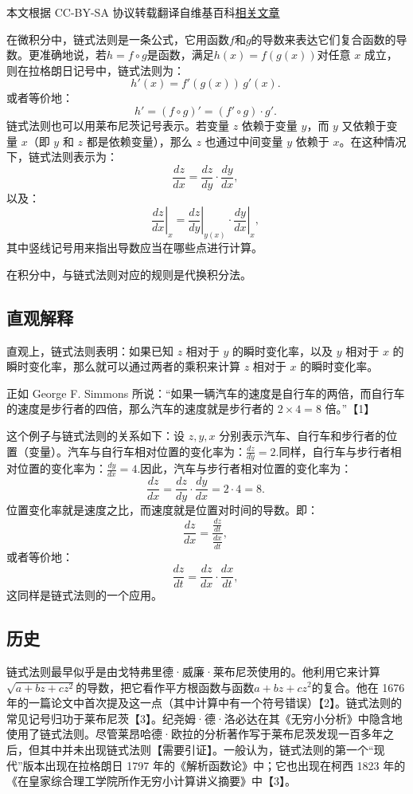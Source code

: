 
本文根据 CC-BY-SA 协议转载翻译自维基百科\href{https://en.wikipedia.org/wiki/Chain_rule}{相关文章}

在微积分中，链式法则是一条公式，它用函数$f$和$g$的导数来表达它们复合函数的导数。更准确地说，若$h = f \circ g$是函数，满足$h(x) = f(g(x))$对任意 $x$ 成立，则在拉格朗日记号中，链式法则为：
$$
h'(x) = f'(g(x)) \, g'(x).~
$$
或者等价地：
$$
h' = (f \circ g)' = (f' \circ g)\cdot g'.~
$$
链式法则也可以用莱布尼茨记号表示。若变量 $z$ 依赖于变量 $y$，而 $y$ 又依赖于变量 $x$（即 $y$ 和 $z$ 都是依赖变量），那么 $z$ 也通过中间变量 $y$ 依赖于 $x$。在这种情况下，链式法则表示为：
$$
\frac{dz}{dx} = \frac{dz}{dy} \cdot \frac{dy}{dx},~
$$
以及：
$$
\left.\frac{dz}{dx}\right|_{x} = \left.\frac{dz}{dy}\right|_{y(x)} \cdot \left.\frac{dy}{dx}\right|_{x},~
$$
其中竖线记号用来指出导数应当在哪些点进行计算。

在积分中，与链式法则对应的规则是代换积分法。
\subsection{直观解释}
直观上，链式法则表明：如果已知 $z$ 相对于 $y$ 的瞬时变化率，以及 $y$ 相对于 $x$ 的瞬时变化率，那么就可以通过两者的乘积来计算 $z$ 相对于 $x$ 的瞬时变化率。

正如 George F. Simmons 所说：“如果一辆汽车的速度是自行车的两倍，而自行车的速度是步行者的四倍，那么汽车的速度就是步行者的 $2 \times 4 = 8$ 倍。”【1】

这个例子与链式法则的关系如下：设 $z, y, x$ 分别表示汽车、自行车和步行者的位置（变量）。汽车与自行车相对位置的变化率为：$\frac{dz}{dy} = 2$.同样，自行车与步行者相对位置的变化率为：$\frac{dy}{dx} = 4$.因此，汽车与步行者相对位置的变化率为：
$$
\frac{dz}{dx} = \frac{dz}{dy}\cdot \frac{dy}{dx} = 2 \cdot 4 = 8.~
$$
位置变化率就是速度之比，而速度就是位置对时间的导数。即：
$$
\frac{dz}{dx} = \frac{\tfrac{dz}{dt}}{\tfrac{dx}{dt}},~
$$
或者等价地：
$$
\frac{dz}{dt} = \frac{dz}{dx}\cdot \frac{dx}{dt},~
$$
这同样是链式法则的一个应用。
\subsection{历史}
链式法则最早似乎是由戈特弗里德·威廉·莱布尼茨使用的。他利用它来计算$\sqrt{a+bz+cz^{2}}$的导数，把它看作平方根函数与函数$a+bz+cz^{2}$的复合。他在 1676 年的一篇论文中首次提及这一点（其中计算中有一个符号错误）【2】。链式法则的常见记号归功于莱布尼茨【3】。纪尧姆·德·洛必达在其《无穷小分析》中隐含地使用了链式法则。尽管莱昂哈德·欧拉的分析著作写于莱布尼茨发现一百多年之后，但其中并未出现链式法则【需要引证】。一般认为，链式法则的第一个“现代”版本出现在拉格朗日 1797 年的《解析函数论》中；它也出现在柯西 1823 年的《在皇家综合理工学院所作无穷小计算讲义摘要》中【3】。
